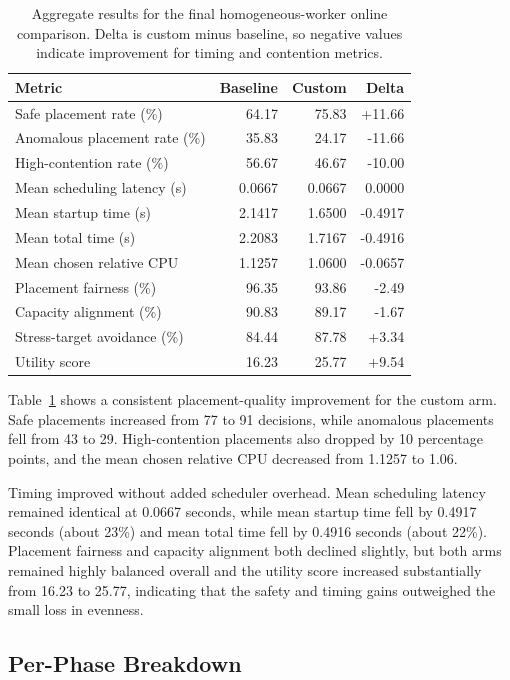 \begin{table}[h]
\centering
\small
\begin{tabular}{lrrr}
\hline
\textbf{Metric} & \textbf{Baseline} & \textbf{Custom} & \textbf{Delta} \\
\hline
Safe placement rate (\%) & 64.17 & 75.83 & +11.66 \\
Anomalous placement rate (\%) & 35.83 & 24.17 & -11.66 \\
High-contention rate (\%) & 56.67 & 46.67 & -10.00 \\
Mean scheduling latency (s) & 0.0667 & 0.0667 & 0.0000 \\
Mean startup time (s) & 2.1417 & 1.6500 & -0.4917 \\
Mean total time (s) & 2.2083 & 1.7167 & -0.4916 \\
Mean chosen relative CPU & 1.1257 & 1.0600 & -0.0657 \\
Placement fairness (\%) & 96.35 & 93.86 & -2.49 \\
Capacity alignment (\%) & 90.83 & 89.17 & -1.67 \\
Stress-target avoidance (\%) & 84.44 & 87.78 & +3.34 \\
Utility score & 16.23 & 25.77 & +9.54 \\
\hline
\end{tabular}
\caption{Aggregate results for the final homogeneous-worker online comparison. Delta is custom minus baseline, so negative values indicate improvement for timing and contention metrics.}
\label{tab:ch4-aggregate-results}
\end{table}

Table~\ref{tab:ch4-aggregate-results} shows a consistent placement-quality improvement for the custom arm. Safe placements increased from 77 to 91 decisions, while anomalous placements fell from 43 to 29. High-contention placements also dropped by 10 percentage points, and the mean chosen relative CPU decreased from 1.1257 to 1.06.

Timing improved without added scheduler overhead. Mean scheduling latency remained identical at 0.0667 seconds, while mean startup time fell by 0.4917 seconds (about 23\%) and mean total time fell by 0.4916 seconds (about 22\%). Placement fairness and capacity alignment both declined slightly, but both arms remained highly balanced overall and the utility score increased substantially from 16.23 to 25.77, indicating that the safety and timing gains outweighed the small loss in evenness.


\subsection{Per-Phase Breakdown}

